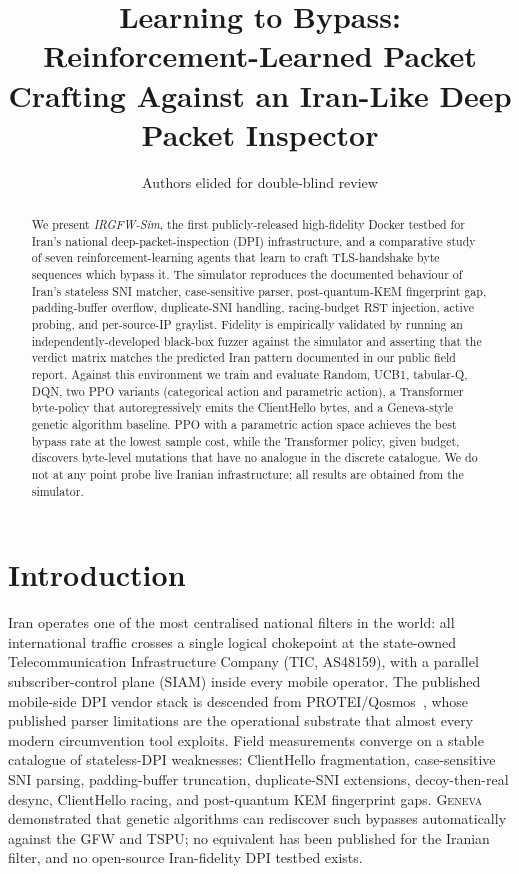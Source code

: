 \documentclass[letterpaper,twocolumn,10pt]{article}
\title{\Large \bf Learning to Bypass: Reinforcement-Learned Packet Crafting Against an Iran-Like Deep Packet Inspector}
\author{
{\rm Authors elided for double-blind review}
}
\begin{document}
\maketitle

\begin{abstract}
We present \emph{IRGFW-Sim}, the first publicly-released high-fidelity Docker
testbed for Iran's national deep-packet-inspection (DPI) infrastructure, and
a comparative study of seven reinforcement-learning agents that learn to
craft TLS-handshake byte sequences which bypass it. The simulator
reproduces the documented behaviour of Iran's stateless SNI matcher,
case-sensitive parser, post-quantum-KEM fingerprint gap, padding-buffer
overflow, duplicate-SNI handling, racing-budget RST injection, active
probing, and per-source-IP graylist. Fidelity is empirically validated by
running an independently-developed black-box fuzzer against the simulator
and asserting that the verdict matrix matches the predicted Iran pattern
documented in our public field report. Against this environment we train
and evaluate Random, UCB1, tabular-Q, DQN, two PPO variants (categorical
action and parametric action), a Transformer byte-policy that
autoregressively emits the ClientHello bytes, and a Geneva-style genetic
algorithm baseline. PPO with a parametric action space achieves the best
bypass rate at the lowest sample cost, while the Transformer policy, given
budget, discovers byte-level mutations that have no analogue in the
discrete catalogue. We do not at any point probe live Iranian
infrastructure; all results are obtained from the simulator.
\end{abstract}

\section{Introduction}
\label{sec:intro}

Iran operates one of the most centralised national filters in the world:
all international traffic crosses a single logical chokepoint at the
state-owned Telecommunication Infrastructure Company (TIC, AS48159), with
a parallel subscriber-control plane (SIAM) inside every mobile operator.
The published mobile-side DPI vendor stack is descended from
PROTEI/Qosmos~\cite{citizenlab2023, theintercept2022}, whose published
parser limitations are the operational substrate that almost every modern
circumvention tool exploits.  Field measurements
\cite{aryan2013,aryapour2025,nym2025,ooni-iran} converge on a stable
catalogue of stateless-DPI weaknesses: ClientHello fragmentation,
case-sensitive SNI parsing, padding-buffer truncation, duplicate-SNI
extensions, decoy-then-real desync, ClientHello racing, and post-quantum
KEM fingerprint gaps. \textsc{Geneva}~\cite{bock2019geneva} demonstrated
that genetic algorithms can rediscover such bypasses automatically against
the GFW and TSPU; no equivalent has been published for the Iranian filter,
and no open-source Iran-fidelity DPI testbed exists.
\end{document}
